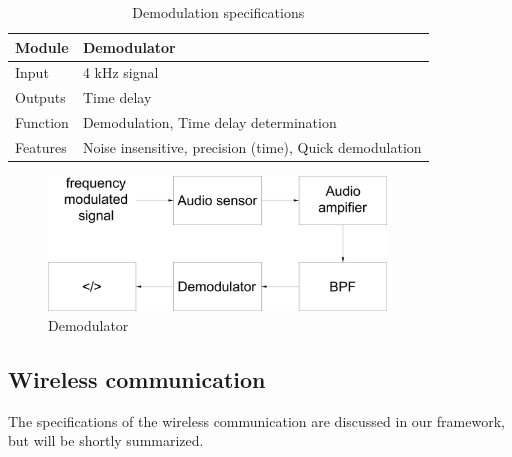 \documentclass[10pt,a4paper]{article}
\begin{document}
\begin{table}[H]
\centering
\caption{Demodulation specifications}
\label{demosensor}
\begin{tabular}{|p{}|p{}|}
\hline
Module   & Demodulator                                   \\ \hline
Input    & 4 kHz signal                                             \\ \hline
Outputs  & Time delay                                         \\ \hline
Function & Demodulation, Time delay determination \\ \hline
Features & Noise insensitive, precision (time), Quick demodulation  \\ \hline
\end{tabular}
\end{table}

\begin{figure}[H]
  \centering
      \includegraphics[width=0.8\textwidth]{demodulator.pdf}
  \caption{Demodulator}
  \label{demodulator}
\end{figure}

\subsection{Wireless communication} 

The specifications of the wireless communication are  discussed in our framework, but will be shortly summarized. 
\end{document}
